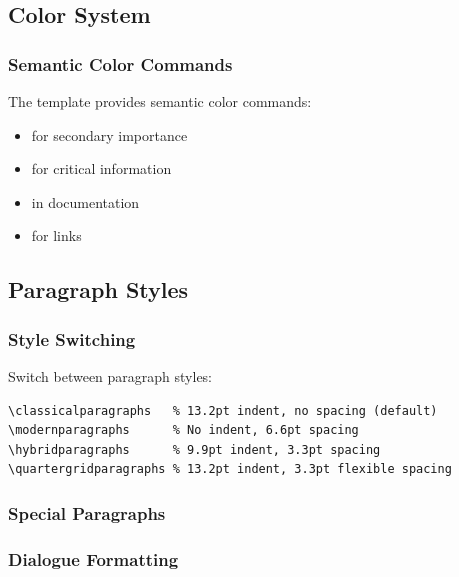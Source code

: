 \subsection{Color System}

\subsubsection{Semantic Color Commands}

The template provides semantic color commands:

\begin{itemize}
\item {} for secondary importance
\item {} for critical information
\item {} in documentation
\item {} for links
\end{itemize}

\subsection{Paragraph Styles}

\subsubsection{Style Switching}

Switch between paragraph styles:

\begin{verbatim}
\classicalparagraphs   % 13.2pt indent, no spacing (default)
\modernparagraphs      % No indent, 6.6pt spacing
\hybridparagraphs      % 9.9pt indent, 3.3pt spacing
\quartergridparagraphs % 13.2pt indent, 3.3pt flexible spacing
\end{verbatim}

\subsubsection{Special Paragraphs}



\subsubsection{Dialogue Formatting}

